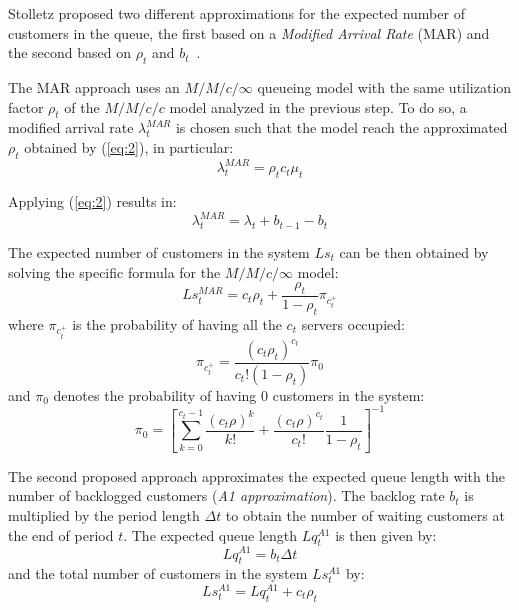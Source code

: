 Stolletz proposed two different approximations for the expected number of customers in the queue, the first based on a \emph{Modified Arrival Rate} (MAR) and the second based on \( \rho_t \) and \( b_t \)~\cite{stolletz}.

The MAR approach uses an \( M/M/c/\infty \) queueing model with the same utilization factor \( \rho_t \) of the \( M/M/c/c \) model analyzed in the previous step. To do so, a modified arrival rate \( \lambda_t^{MAR} \) is chosen such that the model reach the approximated \( \rho_t \) obtained by (\ref{eq:2}), in particular:
\begin{equation}
  \lambda_t^{MAR} = \rho_t c_t \mu_t
\end{equation}

Applying (\ref{eq:2}) results in:
\begin{equation}
  \lambda_t^{MAR} = \lambda_t + b_{t-1} - b_t
\end{equation}

The expected number of customers in the system \( Ls_t \) can be then obtained by solving the specific formula for the \( M/M/c/\infty \) model:
\begin{equation}
  Ls_t^{MAR} = c_t\rho_t + \frac{\rho_t}{1-\rho_t} \pi_{c_t^+}
\end{equation}
where \( \pi_{c_t^+} \) is the probability of having all the \( c_t \) servers occupied:
\begin{equation}
  \pi_{c_t^+} = \frac{(c_t\rho_t)^{c_t}}{c_t!(1-\rho_t)}\pi_0
\end{equation}
and \( \pi_0 \) denotes the probability of having \( 0 \) customers in the system:
\begin{equation}
  \pi_0 = \left[ \sum_{k=0}^{c_t-1} \frac{(c_t\rho)^k}{k!} + \frac{(c_t\rho)^{c_t}}{c_t!} \frac{1}{1-\rho_t} \right]^{-1}
\end{equation}

The second proposed approach approximates the expected queue length with the number of backlogged customers (\emph{A1 approximation}). The backlog rate \( b_t \) is multiplied by the period length \( \Delta t \) to obtain the number of waiting customers at the end of period \( t \). The expected queue length \( Lq_t^{A1} \) is then given by:
\begin{equation}
  Lq_t^{A1} = b_t \Delta t
\end{equation}
and the total number of customers in the system \( Ls_t^{A1} \) by:
\begin{equation}
  Ls_t^{A1} = Lq_t^{A1} + c_t \rho_t
\end{equation}

